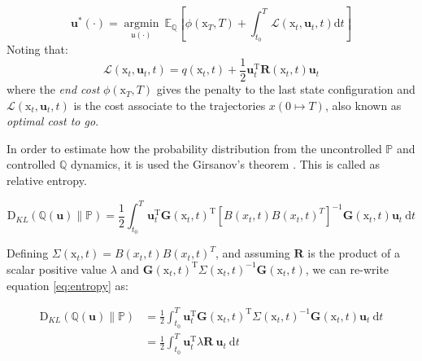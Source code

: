 \documentclass[]{hdsr}
\begin{document}
\begin{equation}
\mathbf{u}^{*}(\cdot)=\underset{\mathfrak{u} (\cdot)}{\operatorname{arg min}} \: \mathbb{E}_{\mathbb{Q}}\left[\phi\left(\mathrm{x}_{T}, T\right)+\int_{t_{0}}^{T} \mathcal{L}\left(\mathrm{x}_{t}, \mathbf{u}_{t}, t\right) \mathrm{d} t\right]
\label{eq:cost}
\end{equation}
Noting that: 
\begin{equation}
\mathcal{L}\left(\mathrm{x}_{t}, \mathbf{u}_{t}, t\right)=q\left(\mathrm{x}_{t}, t\right)+\frac{1}{2} \mathbf{u}_{t}^{\mathrm{T}} \mathbf{R}\left(\mathrm{x}_{t}, t\right) \mathbf{u}_{t}
\end{equation} 
where the \textit{end cost} $\phi\left(\mathrm{x}_{T}, T\right)$ gives the penalty to the last state configuration and $\mathcal{L}\left(\mathrm{x}_{t}, \mathbf{u}_{t}, t\right)$ is the cost associate to the trajectories $x(0\longmapsto T)$, also known as \textit{optimal cost to go}. 

In order to estimate how the probability distribution from the uncontrolled $\mathbb{P}$ and controlled $\mathbb{Q}$ dynamics, it is used the Girsanov's theorem \citep{girsanov1960transforming}. This is called as relative entropy. 

\begin{equation}
\mathrm{D}_{K L}(\mathbb{Q}(\mathbf{u}) \| \mathbb{P}) =  \frac{1}{2} \int_{t_{0}}^{T} \mathbf{u}_{t}^{\mathrm{T}} \mathbf{G}\left(\mathrm{x}_{t}, t\right)^{\mathrm{T}} \left[B\left(x_{t}, t\right)B\left(x_{t}, t\right)^T\right]^{-1} \mathbf{G}\left(\mathrm{x}_{t}, t\right) \mathbf{u}_{t} \mathrm{~d} t \label{eq:entropy}
\end{equation}

Defining $\Sigma\left(\mathrm{x}_{t}, t\right) = B\left(x_{t}, t\right)B\left(x_{t}, t\right)^T$, and assuming $\mathbf{R}$ is the product of a scalar positive value $\lambda$ and $\mathbf{G}\left(\mathrm{x}_{t}, t\right)^{\mathrm{T}} \Sigma\left(\mathrm{x}_{t}, t\right)^{-1} \mathbf{G}\left(\mathrm{x}_{t}, t\right)$, we can re-write equation \ref{eq:entropy} as:

\begin{equation}
\begin{split}
\mathrm{D}_{K L}(\mathbb{Q}(\mathbf{u}) \| \mathbb{P}) &=  \frac{1}{2} \int_{t_{0}}^{T} \mathbf{u}_{t}^{\mathrm{T}} \mathbf{G}\left(\mathrm{x}_{t}, t\right)^{\mathrm{T}} \Sigma\left(\mathrm{x}_{t}, t\right)^{-1} \mathbf{G}\left(\mathrm{x}_{t}, t\right) \mathbf{u}_{t} \mathrm{~d} t \\
&=  \frac{1}{2} \int_{t_{0}}^{T} \mathbf{u}_{t}^{\mathrm{T}} \lambda \mathbf{R}\ \mathbf{u}_{t} \mathrm{~d} t
\end{split}
\end{equation}
\end{document}

